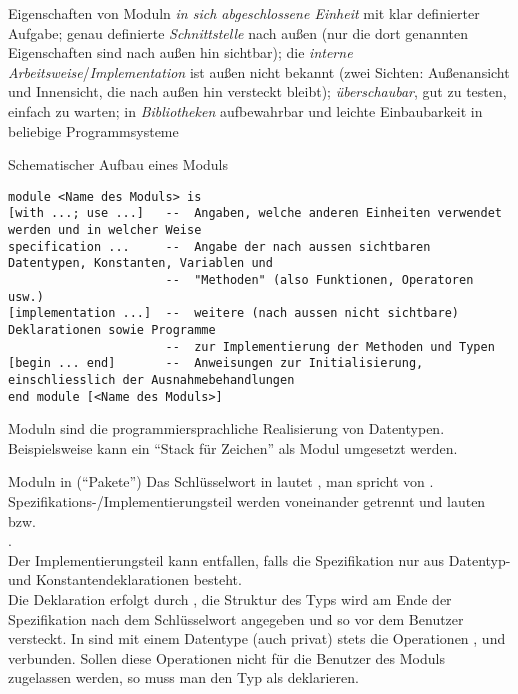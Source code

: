 \begin{Def}{Eigenschaften von Moduln}
    \emph{in sich abgeschlossene Einheit} mit klar definierter Aufgabe;
    genau definierte \emph{Schnittstelle} nach außen (nur die dort
    genannten Eigenschaften sind nach außen hin sichtbar);
    die \emph{interne Arbeitsweise}/\emph{Implementation} ist außen nicht
    bekannt (zwei Sichten: Außenansicht und Innensicht, die nach außen hin
    versteckt bleibt);
    \emph{überschaubar}, gut zu testen, einfach zu warten;
    in \emph{Bibliotheken} aufbewahrbar und leichte Einbaubarkeit in
    beliebige Programmsysteme
\end{Def}

\begin{Def}{Schematischer Aufbau eines Moduls}
\begin{lstlisting}[language=pseudosprache]
module <Name des Moduls> is
[with ...; use ...]   --  Angaben, welche anderen Einheiten verwendet werden und in welcher Weise
specification ...     --  Angabe der nach aussen sichtbaren Datentypen, Konstanten, Variablen und
                      --  "Methoden" (also Funktionen, Operatoren usw.)
[implementation ...]  --  weitere (nach aussen nicht sichtbare) Deklarationen sowie Programme
                      --  zur Implementierung der Methoden und Typen
[begin ... end]       --  Anweisungen zur Initialisierung, einschliesslich der Ausnahmebehandlungen
end module [<Name des Moduls>]
\end{lstlisting}
    \vspace{-10pt}
    Moduln sind die programmiersprachliche Realisierung von Datentypen.
    Beispielsweise kann ein "`Stack für Zeichen"' als Modul umgesetzt werden.
\end{Def}

\begin{Def}{Moduln in \Ada{} ("`Pakete"')}
    Das Schlüsselwort in \Ada{} lautet , man spricht von
    .
    Spezifikations-/Implementierungsteil werden voneinander
    getrennt und lauten \\
    bzw. \\
    . \\
    Der Implementierungsteil kann entfallen, falls die Spezifikation nur
    aus Datentyp- und Konstantendeklarationen besteht. \\
    Die Deklaration  erfolgt durch
    , die Struktur des Typs wird
    am Ende der Spezifikation nach dem Schlüsselwort 
    angegeben und so vor dem Benutzer versteckt.
    In \Ada{} sind mit einem Datentype (auch privat) stets die Operationen
    \adacode{=}, \adacode{/=} und \adacode{:=} verbunden.
    Sollen diese Operationen nicht für die Benutzer des Moduls zugelassen
    werden, so muss man den Typ als  deklarieren.
\end{Def}


